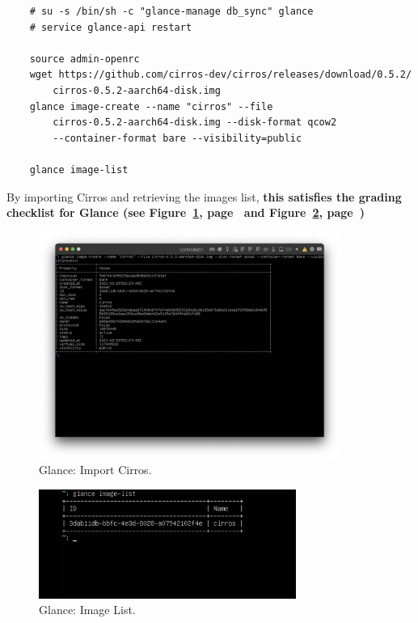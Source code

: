 \documentclass{article}
\begin{document}
\begin{verbatim}
    # su -s /bin/sh -c "glance-manage db_sync" glance
    # service glance-api restart

    source admin-openrc
    wget https://github.com/cirros-dev/cirros/releases/download/0.5.2/
        cirros-0.5.2-aarch64-disk.img
    glance image-create --name "cirros" --file 
        cirros-0.5.2-aarch64-disk.img --disk-format qcow2
        --container-format bare --visibility=public

    glance image-list
\end{verbatim}

By importing Cirros and retrieving the images list, \textbf{this satisfies the grading checklist for Glance (see Figure~\ref{fig:ImportCirros}, page~\pageref{fig:ImportCirros} and Figure~\ref{fig:ImageList}, page~\pageref{fig:ImageList})}

\begin{figure}[ht]
    \centering
    \includegraphics[width=0.88\textwidth]{ImportCirros.png}
    \caption{Glance: Import Cirros.}
    \label{fig:ImportCirros}
\end{figure}

\begin{figure}[ht]
    \centering
    \includegraphics[width=0.75\textwidth]{ImageList.png}
    \caption{Glance: Image List.}
    \label{fig:ImageList}
\end{figure}
\end{document}
